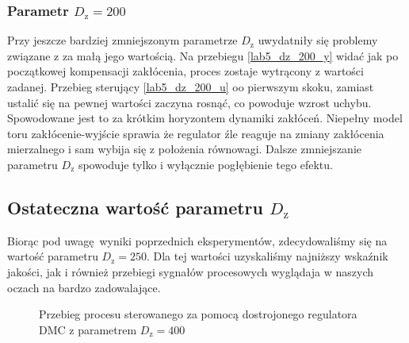 \subsubsection{Parametr $D_{\mathrm{z}} = \num{200}$}
Przy jeszcze bardziej zmniejszonym parametrze $D_{\mathrm{z}}$ uwydatniły się problemy związane z za małą
jego wartością. Na przebiegu \ref{lab5_dz_200_y} widać jak po początkowej kompensacji zakłócenia, proces zostaje
wytrącony z wartości zadanej. Przebieg sterujący \ref{lab5_dz_200_u} oo pierwszym skoku, zamiast ustalić się na 
pewnej wartości zaczyna rosnąć, co powoduje wzrost uchybu. Spowodowane jest to za krótkim horyzontem dynamiki zakłóceń.
Niepełny model toru zakłócenie-wyjście sprawia że regulator źle reaguje na zmiany zakłócenia mierzalnego i sam wybija się 
z położenia równowagi. Dalsze zmniejszanie parametru $D_{\mathrm{z}}$ spowoduje tylko i wyłącznie pogłębienie tego efektu.


\subsection{Ostateczna wartość parametru $D_{\mathrm{z}}$}
Biorąc pod uwagę wyniki poprzednich eksperymentów, zdecydowaliśmy się na wartość parametru $D_{\mathrm{z}} = \num{250}$.
Dla tej wartości uzyskaliśmy najniższy wskaźnik jakości, jak i również przebiegi sygnałów procesowych wyglądaja 
w naszych oczach na bardzo zadowalające.









\begin{figure}[t]    
    \centering
    \caption{Przebieg procesu sterowanego za pomocą dostrojonego regulatora DMC z parametrem $D_{\mathrm{z}} = \num{400}$}
    \label{lab5_dz_400_y}
\end{figure}

